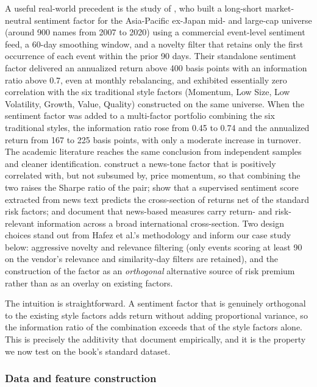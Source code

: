 A useful real-world precedent is the study of \cite{kangrga2020factor}, who built a long-short market-neutral sentiment factor for the Asia-Pacific ex-Japan mid- and large-cap universe (around 900 names from 2007 to 2020) using a commercial event-level sentiment feed, a 60-day smoothing window, and a novelty filter that retains only the first occurrence of each event within the prior 90 days. Their standalone sentiment factor delivered an annualized return above 400 basis points with an information ratio above 0.7, even at monthly rebalancing, and exhibited essentially zero correlation with the six traditional style factors (Momentum, Low Size, Low Volatility, Growth, Value, Quality) constructed on the same universe. When the sentiment factor was added to a multi-factor portfolio combining the six traditional styles, the information ratio rose from 0.45 to 0.74 and the annualized return from 167 to 225 basis points, with only a moderate increase in turnover. The academic literature reaches the same conclusion from independent samples and cleaner identification. \cite{heston2017news} construct a news-tone factor that is positively correlated with, but not subsumed by, price momentum, so that combining the two raises the Sharpe ratio of the pair; \cite{ke2019predicting} show that a supervised sentiment score extracted from news text predicts the cross-section of returns net of the standard risk factors; and \cite{calomiris2019news} document that news-based measures carry return- and risk-relevant information across a broad international cross-section. Two design choices stand out from Hafez et al.'s methodology and inform our case study below: aggressive novelty and relevance filtering (only events scoring at least 90 on the vendor's relevance and similarity-day filters are retained), and the construction of the factor as an \textit{orthogonal} alternative source of risk premium rather than as an overlay on existing factors.

The intuition is straightforward. A sentiment factor that is genuinely orthogonal to the existing style factors adds return without adding proportional variance, so the information ratio of the combination exceeds that of the style factors alone. This is precisely the additivity that \cite{kangrga2020factor} document empirically, and it is the property we now test on the book's standard dataset.

\subsubsection{Data and feature construction}

